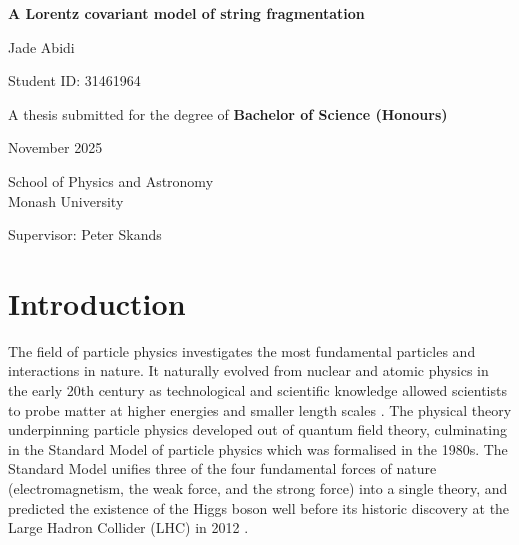 \documentclass[12pt,a4paper]{report}
\begin{document}
\begin{titlepage}
  \centering
  \vspace*{2cm}
  {\LARGE\bfseries A Lorentz covariant model of string fragmentation \par}
  \vspace{1.5cm}
  \Large Jade Abidi \par
  \vspace{0.5cm}
  \large Student ID: 31461964 \par
  \vspace{0.5cm}
  {\large A thesis submitted for the degree of \bfseries{Bachelor of Science (Honours)}} \par
  \vspace{0.5cm}
  \large November 2025 \par
  \vspace{0.5cm}
  \vfill
  \large School of Physics and Astronomy \\ Monash University \par
  \vspace{0.5cm}
  \large Supervisor: Peter Skands \par
  \vfill
\end{titlepage}

\pagebreak

\begin{abstract}
Monte Carlo event generators are extensively used to simulate high-energy particle-collision events. For analytically intractable aspects, they rely on phenomenological models. The so-called Lund model describes the non-perturbative hadronisation process as the fragmentation of a classical string with constant tension. Lorentz covariance then implies the self-similarity of this fragmentation process along the string. The current formulaion of the Lund model, used in the PYTHIA generator, violates this property in terms of both kinematic distributions and hadronic chemistry. We introduce an additional tunable parameter and a new algorithm for string fragmentation that improve or resolve these issues, albeit with some limitations.
\end{abstract}

\pagebreak

\tableofcontents

\chapter{Introduction}
The field of particle physics investigates the most fundamental particles and interactions in nature. It naturally evolved from nuclear and atomic physics in the early 20th century as technological and scientific knowledge allowed scientists to probe matter at higher energies and smaller length scales \cite{navas_review_2024,gross_50_2023}. The physical theory underpinning particle physics developed out of quantum field theory, culminating in the Standard Model of particle physics which was formalised in the 1980s. The Standard Model unifies three of the four fundamental forces of nature (electromagnetism, the weak force, and the strong force) into a single theory, and predicted the existence of the Higgs boson well before its historic discovery at the Large Hadron Collider (LHC) in 2012 \cite{schwartz_quantum_2014,atlas_observation_2012}.
\end{document}
